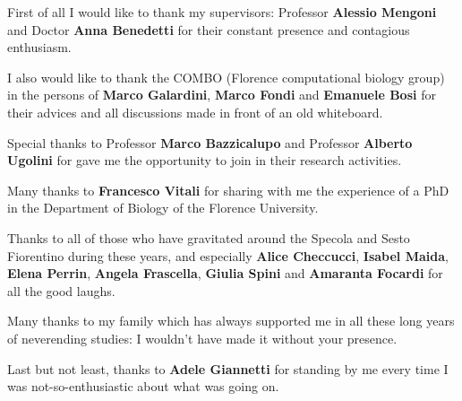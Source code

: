{\small
First of all I would like to thank my supervisors: Professor \textbf{Alessio Mengoni} and Doctor \textbf{Anna Benedetti} for their constant presence and contagious enthusiasm.

\noindent I also would like to thank the COMBO (Florence computational biology group) in the persons of \textbf{Marco Galardini}, \textbf{Marco Fondi} and \textbf{Emanuele Bosi} for their advices and all discussions made in front of an old whiteboard.

\noindent Special thanks to Professor \textbf{Marco Bazzicalupo} and Professor \textbf{Alberto Ugolini} for gave me the opportunity to join in their research activities.

\noindent Many thanks to \textbf{Francesco Vitali} for sharing with me the experience of a PhD in the Department of Biology of the Florence University.

\noindent Thanks to all of those who have gravitated around the Specola and Sesto Fiorentino during these years, and especially \textbf{Alice Checcucci}, \textbf{Isabel Maida}, \textbf{Elena Perrin}, \textbf{Angela Frascella}, \textbf{Giulia Spini} and \textbf{Amaranta Focardi} for all the good laughs.

\noindent Many thanks to my family which has always supported me in all these long years of neverending studies: I wouldn't have made it without your presence.

\noindent Last but not least, thanks to \textbf{Adele Giannetti} for standing by me every time I was not-so-enthusiastic about what was going on.
}

\endgroup



